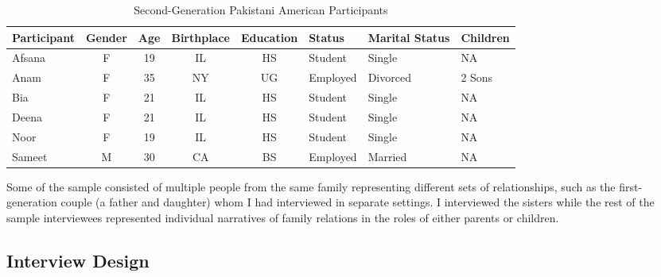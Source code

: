 \begin{table}[hptb]
\centering
\caption{Second-Generation Pakistani American Participants}
\label{tab:second-generation}
\begin{tabular}{|l|c|c|c|c|l|l|l|}
\hline
\textbf{Participant} & \textbf{Gender} & \textbf{Age} & \textbf{Birthplace} & \textbf{Education} & \textbf{Status} & \textbf{Marital Status} & \textbf{Children} \\ \hline
Afsana               & F               & 19           & IL                  & HS                 & Student         & Single                  & NA                \\ \hline
Anam                 & F               & 35           & NY                  & UG                 & Employed        & Divorced                & 2 Sons            \\ \hline
Bia                  & F               & 21           & IL                  & HS                 & Student         & Single                  & NA                \\ \hline
Deena                & F               & 21           & IL                  & HS                 & Student         & Single                  & NA                \\ \hline
Noor                 & F               & 19           & IL                  & HS                 & Student         & Single                  & NA                \\ \hline
Sameet               & M               & 30           & CA                  & BS                 & Employed        & Married                 & NA                \\ \hline
\end{tabular}
\end{table}

Some of the sample consisted of multiple people from the same family representing different sets of relationships, such as the first-generation couple (a father and daughter) whom I had interviewed in separate settings. I interviewed the sisters while the rest of the sample interviewees represented individual narratives of   family relations in the roles of either parents or children.

\subsection{Interview Design}

